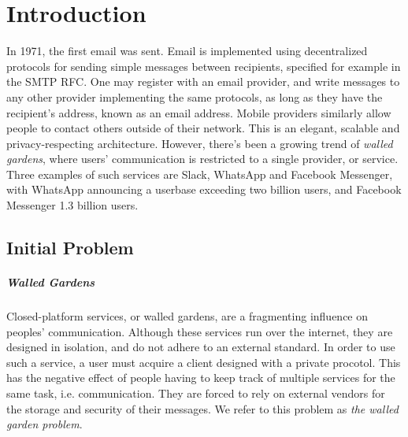 \chapter{Introduction}
In 1971, the first email was sent\cite{tomlinson2009first}.
Email is implemented using decentralized protocols for sending simple messages between recipients, specified for example in the \ac{SMTP} \ac{RFC}\cite{RFC5321}.
One may register with an email provider, and write messages to any other provider implementing the same protocols, as long as they have the recipient's address, known as an email address.
Mobile providers similarly allow people to contact others outside of their network.
This is an elegant, scalable and privacy-respecting architecture.
However, there's been a growing trend of \textit{walled gardens}\cite{walled_gardens_gunnar_wolf_acm_2018}, where users' communication is restricted to a single provider, or service.
Three examples of such services are Slack, WhatsApp and Facebook Messenger, with WhatsApp announcing a userbase exceeding two billion users, and Facebook Messenger 1.3 billion users\cite{walled_gardens_gunnar_wolf_acm_2018,whatsapp_2b_users_archive_org,messenger_1pt3b_users}.

\section{Initial Problem}\label{subsec:initial_problem_statement}
\paragraph{Walled Gardens}
Closed-platform services, or walled gardens, are a fragmenting influence on peoples' communication.
Although these services run over the internet, they are designed in isolation, and do not adhere to an external standard.
In order to use such a service, a user must acquire a client designed with a private procotol.
This has the negative effect of people having to keep track of multiple services for the same task, i.e. communication.
They are forced to rely on external vendors for the storage and security of their messages.
We refer to this problem as \textit{the walled garden problem}.

